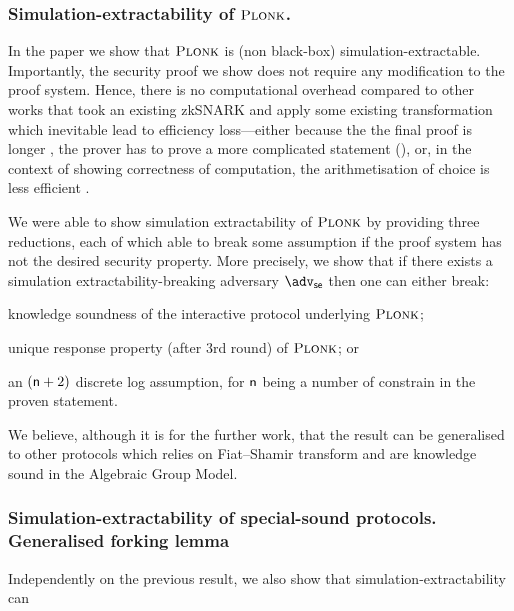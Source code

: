 \documentclass[runningheads,11pt]{llncs}
\begin{document}
	\subsubsection*{Simulation-extractability of $\textsc{Plonk}$.}
	In the paper we show that $\textsc{Plonk}$ is (non black-box) simulation-extractable. Importantly, the security proof we show does not require any modification to the proof system. 
	Hence, there is no computational overhead compared to other works that took an existing zkSNARK and apply some existing transformation which inevitable lead to efficiency loss---either because the the final proof is longer \cite{EPRINT:BowGab18}, the prover has to prove a more complicated statement (\cite{ASIACCS:DerSla18,EPRINT:AbdRamSla20}), or, in the context of showing correctness of computation, the arithmetisation of choice is less efficient \cite{C:GroMal17}.
	
	We were able to show simulation extractability of $\textsc{Plonk}$ by providing three reductions, each of which able to break some assumption if the proof system has not the desired security property. 
	More precisely, we show that if there exists a simulation extractability-breaking adversary $\advse$ then one can either break: 
	\begin{compactenum}
		\item \label{it:ks} knowledge soundness of the interactive protocol underlying $\textsc{Plonk}$; 
		\item \label{it:dlog} unique response property (after $3$rd round) of $\textsc{Plonk}$; or 
		\item \label{it:ur} an $(\mathsf{n} + 2)$ discrete log assumption, for $\mathsf{n}$ being a number of constrain in the proven statement.
	\end{compactenum}
	
	\medskip
	We believe, although it is for the further work, that the result can be generalised to other protocols which relies on Fiat--Shamir transform and are knowledge sound in the Algebraic Group Model.
	
	\subsubsection*{Simulation-extractability of special-sound protocols. Generalised forking lemma}
	Independently on the previous result, we also show that simulation-extractability can 
	
	
	
\end{document}
